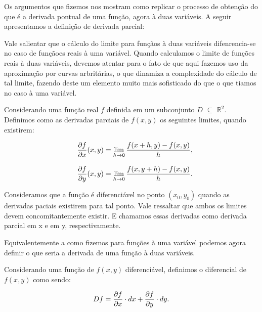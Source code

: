 Os argumentos que fizemos nos mostram como replicar o processo de obtenção do
que é a derivada pontual de uma função, agora à duas variáveis. A seguir
apresentamos a definição de derivada parcial:

\begin{definition}

    Vale salientar que o cálculo do limite para funçãos à duas variáveis
    difenrencia-se no caso de funçãoes reais à uma variável. Quando calculamos
    o limite de funções reais à duas variáveis, devemos atentar para o fato
    de que aqui fazemos uso da aproximação por curvas arbritárias, o que
    dinamiza a complexidade do cálculo de tal limite, fazendo deste um elemento
    muito mais sofisticado do que o que tiamos no caso à uma variável.

    Considerando uma função real $f$ definida em um subconjunto $D$ $\subseteq$ \(\mathbb{R}^2\). Definimos como as derivadas parciais de $f(x, y)$ os seguintes limites, quando existirem:

    \begin{equation}
        \begin{array}{ccc}
            &   \displaystyle {\frac{\partial f}{\partial x}(x, y) = \lim\limits_{h \to 0} \frac{f(x+h, y) - f(x, y)}{h},}\\
            &\\
            &   \displaystyle {\frac{\partial f}{\partial y}(x, y) = \lim\limits_{h \to 0} \frac{f(x,y+h) - f(x,y)}{h}.}\\
        \end{array}
    \end{equation}

\end{definition}

Consideramos que a função é diferenciável no ponto \( (x_0, y_0) \) quando as
derivadas paciais existirem para tal ponto. Vale ressaltar que ambos os limites
devem concomitantemente existir. E chamamos essas derivadas como derivada
parcial em x e em y, respectivamente.

Equivalentemente a como fizemos para funções à uma variável podemos agora
definir o que seria a derivada de uma função à duas variáveis.

\begin{definition}[Diferencial de $f(x, y)$]
    Considerando uma função de $f(x, y)$ diferenciável, definimos o diferencial
    de $f(x, y)$ como sendo:

    \begin{equation}
        Df = \frac{\partial f}{\partial x} \cdot dx + \frac{\partial f}{\partial y} \cdot dy.
    \end{equation}

\end{definition}

